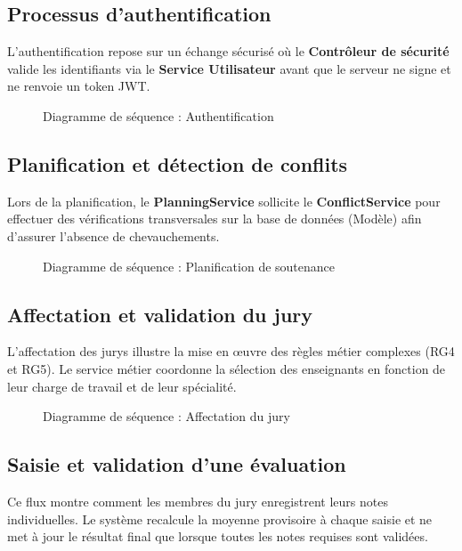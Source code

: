 \documentclass[12pt,a4paper]{article}
\begin{document}
\subsection{Processus d'authentification}
L'authentification repose sur un échange sécurisé où le \textbf{Contrôleur de sécurité} valide les identifiants via le \textbf{Service Utilisateur} avant que le serveur ne signe et ne renvoie un token JWT.

\begin{figure}[H]
    \centering
    \caption{Diagramme de séquence : Authentification}
\end{figure}

\subsection{Planification et détection de conflits}
Lors de la planification, le \textbf{PlanningService} sollicite le \textbf{ConflictService} pour effectuer des vérifications transversales sur la base de données (Modèle) afin d'assurer l'absence de chevauchements.

\begin{figure}[H]
    \centering
    \caption{Diagramme de séquence : Planification de soutenance}
\end{figure}

\subsection{Affectation et validation du jury}
L'affectation des jurys illustre la mise en œuvre des règles métier complexes (RG4 et RG5). Le service métier coordonne la sélection des enseignants en fonction de leur charge de travail et de leur spécialité.

\begin{figure}[H]
    \centering
    \caption{Diagramme de séquence : Affectation du jury}
\end{figure}

\subsection{Saisie et validation d'une évaluation}
Ce flux montre comment les membres du jury enregistrent leurs notes
individuelles. Le système recalcule la moyenne provisoire à chaque saisie et ne
met à jour le résultat final que lorsque toutes les notes requises sont validées.
\end{document}
